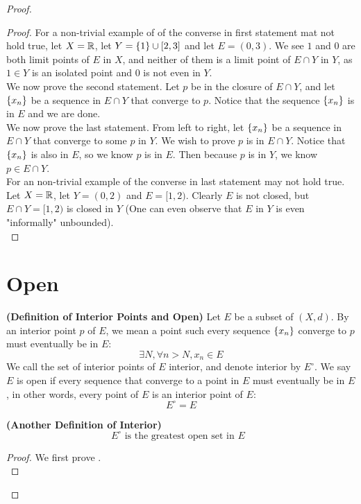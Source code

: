\documentclass{report}
\begin{document}
\begin{proof}
\begin{proof}
For a non-trivial example of of the converse in first statement mat not hold true, let $X=\mathbb{R}$, let $Y=\{ 1 \}\cup [2,3]$ and let $E=(0,3)$. We see $1$ and $0$ are both limit points of $E$ in $X$, and neither of them is a limit point of  $E\cap Y$ in $Y$, as $1\in Y$ is an isolated point and $0$ is not even in $Y$.\\

We now prove the second statement. Let $p$ be in the closure of $E\cap Y$, and let $\{ x_n \}$ be a sequence in $E\cap Y$ that converge to $p$. Notice that the sequence $\{ x_n \}$ is in $E$ and we are done.\\

We now prove the last statement. From left to right, let $\{ x_n \}$ be a sequence in $E\cap Y$ that converge to some $p$ in $Y$. We wish to prove  $p$ is in  $E\cap Y$. Notice that $\{ x_n \}$ is also in $E$, so we know  $p$ is in $E$. Then because $p$ is in $Y$, we know  $p\in  E\cap Y$.\\

For an non-trivial example of the converse in last statement may not hold true. Let $X=\mathbb{R}$, let $Y=(0,2)$ and $E=[1,2)$. Clearly $E$ is not closed, but  $E\cap Y=[1,2)$ is closed in $Y$ (One can even observe that $E$ in  $Y$ is even "informally" unbounded).\\
\end{proof}
\section{Open}
\begin{definition}
\label{3.3.1}
\textbf{(Definition of Interior Points and Open)} Let $E$ be a subset of $(X,d)$. By an interior point $p$ of $E$, we mean a point such every sequence  $\{ x_n \}$ converge to $p$ must eventually be in  $E$:
 \begin{equation}
\exists N, \forall n>N, x_n\in E
\end{equation}
We call the set of interior points of $E$  interior, and denote interior by  $E^\circ $. We say $E$ is open if every sequence that converge to a point in  $E$ must eventually be in  $E$, in other words, every point of $E$ is an interior point of $E$:
 \begin{equation}
E^\circ =E
\end{equation}
\end{definition}
\begin{theorem}
\label{3.3.2}
\textbf{(Another Definition of Interior)} 
\begin{equation}
E^\circ\text{ is the greatest open set in $E$ }
\end{equation}
\end{theorem}
\begin{proof}
We first prove .\\


\end{proof}
\end{proof}
\end{document}
